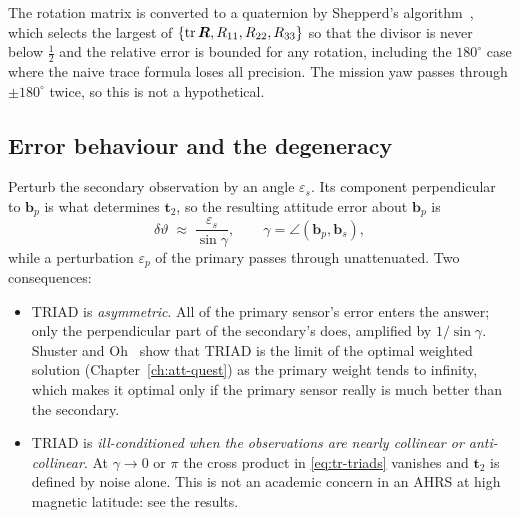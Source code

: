 The rotation matrix is converted to a quaternion by Shepperd's algorithm~\cite{shepperd1978}, which
selects the largest of $\{\operatorname{tr}\bm{R},R_{11},R_{22},R_{33}\}$ so that the divisor is never below
$\tfrac12$ and the relative error is bounded for any rotation, including the $180^\circ$ case where
the naive trace formula loses all precision. The mission yaw passes through $\pm180^\circ$ twice, so
this is not a hypothetical.

\subsection{Error behaviour and the degeneracy}
Perturb the secondary observation by an angle $\varepsilon_s$. Its component perpendicular to
$\bm{b}_p$ is what determines $\bm{t}_2$, so the resulting attitude error about $\bm{b}_p$ is
\begin{equation}
\delta\vartheta \;\approx\; \frac{\varepsilon_s}{\sin\gamma},
\qquad \gamma = \angle(\bm{b}_p,\bm{b}_s),
\label{eq:tr-amplify}
\end{equation}
while a perturbation $\varepsilon_p$ of the primary passes through unattenuated. Two consequences:
\begin{itemize}[nosep]
\item TRIAD is \emph{asymmetric}. All of the primary sensor's error enters the answer; only the
perpendicular part of the secondary's does, amplified by $1/\sin\gamma$. Shuster and
Oh~\cite{shusteroh1981} show that TRIAD is the limit of the optimal weighted solution
(Chapter~\ref{ch:att-quest}) as the primary weight tends to infinity, which makes it optimal only if
the primary sensor really is much better than the secondary.
\item TRIAD is \emph{ill-conditioned when the observations are nearly collinear or
anti-collinear}. At $\gamma\to0$ or $\pi$ the cross product in \eqref{eq:tr-triads} vanishes and
$\bm{t}_2$ is defined by noise alone. This is not an academic concern in an AHRS at high magnetic
latitude: see the results.
\end{itemize}

